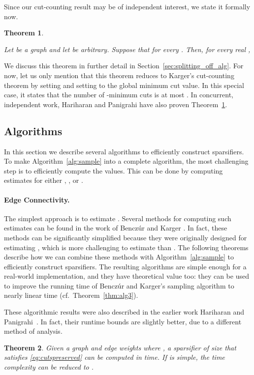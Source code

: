 \documentclass[11pt]{article}
\numberwithin{equation}{section}
\newtheorem{theorem}{Theorem}[section]
\newcommand{\Algorithm}[1]{Algorithm~\ref{alg:#1}}
\newcommand{\Section}[1]{Section~\ref{sec:#1}}
\newcommand{\TheoremName}[1]{\label{thm:#1}}
\newcommand{\Theorem}[1]{Theorem~\ref{thm:#1}}
\begin{document}
Since our cut-counting result may be of independent interest,
we state it formally now.

\newcommand{\thmcountcutclass}{
    Let  be a graph and let  be arbitrary.
    Suppose that  for every .
    Then, for every real ,
    }
\begin{theorem}
\TheoremName{count_cut_class}
\thmcountcutclass
\end{theorem}

We discuss this theorem in further detail in \Section{splitting_off_alg}.
For now, let us only mention that this theorem reduces to
Karger's cut-counting theorem
by setting  and setting  to the global minimum cut value.
In this special case, it states that
the number of -minimum cuts is at most .
In concurrent, independent work, Hariharan and Panigrahi \cite{HP}
have also proven \Theorem{count_cut_class}.


\subsection{Algorithms}

In this section we describe several algorithms to efficiently construct sparsifiers.
To make \Algorithm{sample} into a complete algorithm,
the most challenging step is to efficiently compute the  values.
This can be done by computing estimates for either , , or .

\paragraph{Edge Connectivity.}
The simplest approach is to estimate .
Several methods for computing such estimates can be found
in the work of Bencz\'ur and Karger \cite{BK}.
In fact, these methods can be significantly simplified
because they were originally designed for estimating ,
which is more challenging to estimate than .
The following theorems describe how we can combine these methods with \Algorithm{sample}
to efficiently construct sparsifiers.
The resulting algorithms are simple enough for a real-world implementation,
and they have theoretical value too:
they can be used to improve the  running time of 
Bencz\'ur and Karger's sampling algorithm to nearly linear time (cf.~\Theorem{alg3}).

These algorithmic results were also described in the earlier work Hariharan and Panigrahi~\cite{HP}.
In fact, their runtime bounds are slightly better, due to a different method of analysis.

\begin{theorem}
\label{thm:alg1}
Given a graph  and edge weights 
where , 
a sparsifier  of size 
that satisfies \eqref{eq:cutspreserved} can be computed in  time.
If  is simple, the time complexity can be reduced to .
\end{theorem}
\end{document}
